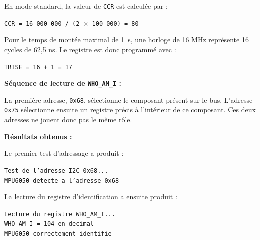 \documentclass[11pt,a4paper]{article}
\begin{document}
\begin{sessionbox}
		En mode standard, la valeur de \texttt{CCR} est calculée par :
		
		\begin{center}
			\texttt{CCR = 16 000 000 / (2 $\times$ 100 000) = 80}
		\end{center}
		
		Pour le temps de montée maximal de 1~\textmu s, une horloge de 16 MHz représente 16 cycles de 62,5 ns. Le registre est donc programmé avec :
		
		\begin{center}
			\texttt{TRISE = 16 + 1 = 17}
		\end{center}
		
		\vspace{0.3cm}
		
		\textbf{Séquence de lecture de \texttt{WHO\_AM\_I} :}
		
		\begin{center}
		\end{center}
		
		La première adresse, \texttt{0x68}, sélectionne le composant présent sur le bus. L'adresse \texttt{0x75} sélectionne ensuite un registre précis à l'intérieur de ce composant. Ces deux adresses ne jouent donc pas le même rôle.
		
		\vspace{0.3cm}
		
		\textbf{Résultats obtenus :}
		
		Le premier test d'adressage a produit :
		
		\begin{center}
			\texttt{Test de l'adresse I2C 0x68...}\\
			\texttt{MPU6050 detecte a l'adresse 0x68}
		\end{center}
		
		La lecture du registre d'identification a ensuite produit :
		
		\begin{center}
			\texttt{Lecture du registre WHO\_AM\_I...}\\
			\texttt{WHO\_AM\_I = 104 en decimal}\\
			\texttt{MPU6050 correctement identifie}
		\end{center}
		

\end{sessionbox}
\end{document}
